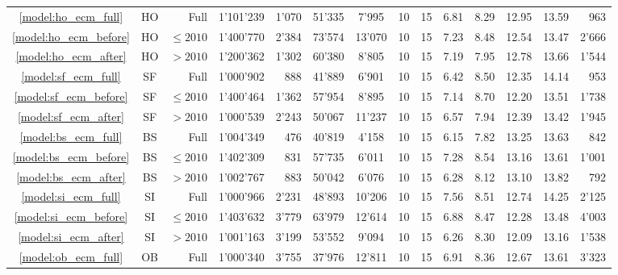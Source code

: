 \begin{landscape}
\begin{table}[htbp]
\begin{tabular}{c c r r r r c c c c c c c r}
            \textcolor{blue}{\ref{model:ho_ecm_full}}& HO & Full & 1'101'239 & 1'070 & 51'335 & 7'995 & 10 & 15 & 6.81 & 8.29 & 12.95 & 13.59 & 963\\
            \textcolor{blue}{\ref{model:ho_ecm_before}}& HO & $\leq2010$ & 1'400'770 & 2'384 & 73'574 & 13'070 & 10 & 15 & 7.23 & 8.48 & 12.54 & 13.47 & 2'666\\
            \textcolor{blue}{\ref{model:ho_ecm_after}}& HO & $>2010$ & 1'200'362 & 1'302 & 60'380 & 8'805 & 10 & 15 & 7.19 & 7.95 & 12.78 & 13.66 & 1'544\\
            \hline
            \textcolor{blue}{\ref{model:sf_ecm_full}}& SF & Full & 1'000'902 & 888 & 41'889 & 6'901 & 10 & 15 & 6.42 & 8.50 & 12.35 & 14.14 & 953\\
            \textcolor{blue}{\ref{model:sf_ecm_before}}& SF & $\leq2010$ & 1'400'464 & 1'362 & 57'954 & 8'895 & 10 & 15 & 7.14 & 8.70 & 12.20 & 13.51 & 1'738\\
            \textcolor{blue}{\ref{model:sf_ecm_after}}& SF & $>2010$ & 1'000'539 & 2'243 & 50'067 & 11'237 & 10 & 15 & 6.57 & 7.94 & 12.39 & 13.42 & 1'945\\
            \hline
            \textcolor{blue}{\ref{model:bs_ecm_full}}& BS & Full & 1'004'349 & 476 & 40'819 & 4'158 & 10 & 15 & 6.15 & 7.82 & 13.25 & 13.63 & 842\\
            \textcolor{blue}{\ref{model:bs_ecm_before}}& BS & $\leq2010$ & 1'402'309 & 831 & 57'735 & 6'011 & 10 & 15 & 7.28 & 8.54 &13.16 & 13.61 & 1'001\\
            \textcolor{blue}{\ref{model:bs_ecm_after}}& BS & $>2010$ & 1'002'767 & 883 & 50'042 & 6'076 & 10 & 15 & 6.28 & 8.12 & 13.10 & 13.82 & 792\\
            \hline
            \textcolor{blue}{\ref{model:si_ecm_full}}& SI & Full & 1'000'966 & 2'231 & 48'893 & 10'206 & 10 & 15 & 7.56 & 8.51 & 12.74 & 14.25 & 2'125\\
            \textcolor{blue}{\ref{model:si_ecm_before}}& SI & $\leq2010$ & 1'403'632 & 3'779 & 63'979 & 12'614 & 10 & 15 & 6.88 & 8.47 & 12.28 & 13.48 & 4'003\\
            \textcolor{blue}{\ref{model:si_ecm_after}}& SI & $>2010$ & 1'001'163 & 3'199 & 53'552 & 9'094 & 10 & 15 & 6.26 & 8.30 & 12.09 & 13.16 & 1'538\\
            \hline
            \textcolor{blue}{\ref{model:ob_ecm_full}}& OB & Full & 1'000'340 & 3'755 & 37'976 & 12'811 & 10 & 15 & 6.91 & 8.36 & 12.67 & 13.61 & 3'323\\

\end{tabular}
\end{table}
\end{landscape}
